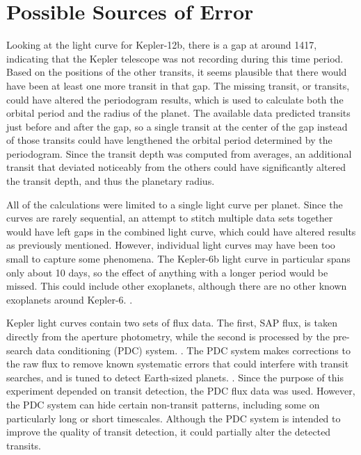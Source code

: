 \section{Possible Sources of Error}

Looking at the light curve for Kepler-12b, there is a gap at around \SI{1417}{\bjd}, indicating that the Kepler telescope was not recording during
this time period. Based on the positions of the other transits, it seems plausible that there would have been at least one more transit in that gap.
The missing transit, or transits, could have altered the periodogram results, which is used to calculate both the orbital period and the radius
of the planet. The available data predicted transits just before and after the gap, so a single transit at the center of the gap instead of those
transits could have lengthened the orbital period determined by the periodogram. Since the transit depth was computed from averages, an additional transit
that deviated noticeably from the others could have significantly altered the transit depth, and thus the planetary radius.

All of the calculations were limited to a single light curve per planet. Since the curves are rarely sequential, an attempt to stitch multiple data
sets together would have left gaps in the combined light curve, which could have altered results as previously mentioned. However, individual light
curves may have been too small to capture some phenomena. The Kepler-6b light curve in particular spans only about 10 days, so the effect of anything
with a longer period would be missed. This could include other exoplanets, although there are no other known exoplanets around Kepler-6. \autocite{exoplanetEncyclopedia}.

Kepler light curves contain two sets of flux data. The first, SAP flux, is taken directly from the aperture photometry, while the second is processed
by the pre-search data conditioning (PDC) system. \autocite{keplerManual}. The PDC system makes corrections to the raw flux to remove known
systematic errors that could interfere with transit searches, and is tuned to detect Earth-sized planets. \autocite{pdc}. Since the purpose of this experiment depended on transit detection, the
PDC flux data was used. However, the PDC system can hide certain non-transit patterns, including some on particularly long or short timescales. \autocite{pdc}
Although the PDC system is intended to improve the quality of transit detection, it could partially alter the detected transits.
